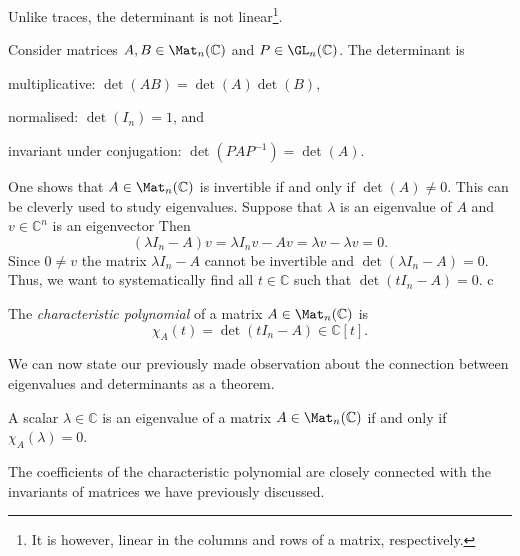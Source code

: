 \documentclass[a4paper,oneside, 12pt]{amsart}
\begin{document}
Unlike traces, the determinant is not linear\footnote{%
  It is however, linear in the columns and rows of a matrix, respectively.}.

\begin{proposition}\label{prop:basic-properties-of-determinant}
  Consider matrices \(A, B \in\Mat_{n}( \mathbb{C}) \) and \(P \in \GL_{n}( \mathbb{C})\).
  The determinant is
  \begin{thmlist}
    \item multiplicative: \(\det(AB) = \det(A) \det (B)\),
    \item normalised: \(\det(I_{n}) = 1\), and
    \item invariant under conjugation: \(\det(PAP^{-1})= \det(A)\).
  \end{thmlist}
\end{proposition}

One shows that \(A\in \Mat_{n}( \mathbb{C})\) is invertible if and only if \(\det(A) \neq 0\).
This can be cleverly used to study eigenvalues.
Suppose that \(\lambda\) is an eigenvalue of \(A\) and \(v \in \mathbb{C}^{n}\) is an eigenvector
Then
\begin{equation*}
  (\lambda I_{n} - A) v = \lambda I_{n} v - Av = \lambda v - \lambda v =0.
\end{equation*}
Since \(0 \neq v\) the matrix \(\lambda I_{n} - A\) cannot be invertible and \(\det (\lambda I_{n} - A) = 0\).
Thus, we want to systematically find all \(t \in \mathbb{C}\) such that  \(\det(t I_{n} - A) = 0\).
c
\begin{definition}\label{def:char-poly}
  The \emph{characteristic polynomial} of a matrix \( A \in \Mat_n(\mathbb{C}) \) is
  \begin{equation}
    \chi_A(t) = \det(t I_n - A) \in \mathbb{C}[t].
  \end{equation}
\end{definition}
We can now state our previously made observation about the connection between eigenvalues and determinants as a theorem.
\begin{theorem}\label{thm:eigenvalues-and-char-poly}
  A scalar \(\lambda \in \mathbb{C}\) is an eigenvalue of a matrix \(A\in \Mat_{n}( \mathbb{C})\) if and only if \(\chi_{A}(\lambda) = 0\).
\end{theorem}

The coefficients of the characteristic polynomial are closely connected with the invariants of matrices we have previously discussed.
\end{document}
